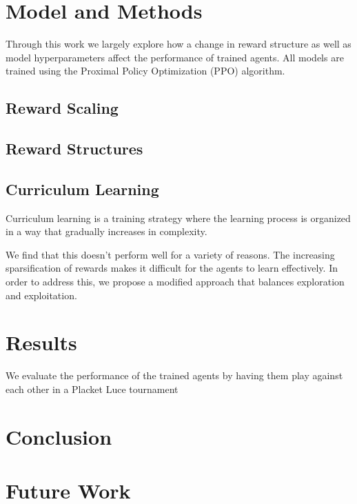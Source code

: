 \documentclass[conference]{IEEEtran}
\begin{document}
\section{Model and Methods}
Through this work we largely explore how a change in reward structure as well as model hyperparameters affect the performance of trained agents. All models are trained using the Proximal Policy Optimization (PPO) algorithm.

\subsection{Reward Scaling}

\subsection{Reward Structures}

\subsection{Curriculum Learning}
Curriculum learning is a training strategy where the learning process is organized in a way that gradually increases in complexity. 

We find that this doesn't perform well for a variety of reasons. The increasing sparsification of rewards makes it difficult for the agents to learn effectively. In order to address this, we propose a modified approach that balances exploration and exploitation.

\section{Results}
We evaluate the performance of the trained agents by having them play against each other in a Placket Luce tournament \cite{ranking2010label} 


\section{Conclusion}

\section{Future Work}



\end{document}
